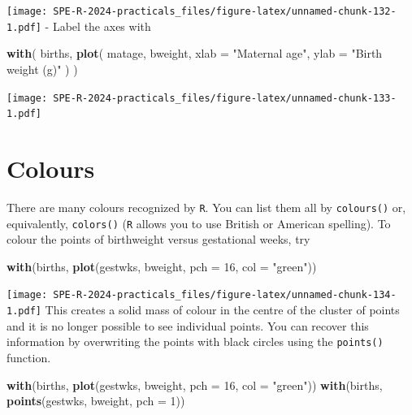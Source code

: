 \documentclass[
]{book}
\newenvironment{Shaded}{\begin{snugshade}}{\end{snugshade}}
\newcommand{\AttributeTok}[1]{\textcolor[rgb]{0.13,0.29,0.53}{#1}}
\newcommand{\DecValTok}[1]{\textcolor[rgb]{0.00,0.00,0.81}{#1}}
\newcommand{\FunctionTok}[1]{\textcolor[rgb]{0.13,0.29,0.53}{\textbf{#1}}}
\newcommand{\NormalTok}[1]{#1}
\newcommand{\StringTok}[1]{\textcolor[rgb]{0.31,0.60,0.02}{#1}}
\begin{document}
\texttt{[image: SPE-R-2024-practicals\_files/figure-latex/unnamed-chunk-132-1.pdf]}
- Label the axes with

\begin{Shaded}
\begin{Highlighting}[]
\FunctionTok{with}\NormalTok{(}
\NormalTok{  births, }
  \FunctionTok{plot}\NormalTok{(}
\NormalTok{    matage, }
\NormalTok{    bweight, }
    \AttributeTok{xlab =} \StringTok{"Maternal age"}\NormalTok{, }
    \AttributeTok{ylab =} \StringTok{"Birth weight (g)"}
\NormalTok{  )}
\NormalTok{)}
\end{Highlighting}
\end{Shaded}

\texttt{[image: SPE-R-2024-practicals\_files/figure-latex/unnamed-chunk-133-1.pdf]}

\section{Colours}\label{colours}

There are many colours recognized by \texttt{R}. You can list them all by
\texttt{colours()} or, equivalently, \texttt{colors()} (\texttt{R} allows you to
use British or American spelling). To colour the points of birthweight
versus gestational weeks, try

\begin{Shaded}
\begin{Highlighting}[]
\FunctionTok{with}\NormalTok{(births, }\FunctionTok{plot}\NormalTok{(gestwks, bweight, }\AttributeTok{pch =} \DecValTok{16}\NormalTok{, }\AttributeTok{col =} \StringTok{"green"}\NormalTok{))}
\end{Highlighting}
\end{Shaded}

\texttt{[image: SPE-R-2024-practicals\_files/figure-latex/unnamed-chunk-134-1.pdf]}
This creates a solid mass of colour in the centre of the cluster of
points and it is no longer possible to see individual points. You can
recover this information by overwriting the points with black circles
using the \texttt{points()} function.

\begin{Shaded}
\begin{Highlighting}[]
\FunctionTok{with}\NormalTok{(births, }\FunctionTok{plot}\NormalTok{(gestwks, bweight, }\AttributeTok{pch =} \DecValTok{16}\NormalTok{, }\AttributeTok{col =} \StringTok{"green"}\NormalTok{))}
\FunctionTok{with}\NormalTok{(births, }\FunctionTok{points}\NormalTok{(gestwks, bweight, }\AttributeTok{pch =} \DecValTok{1}\NormalTok{))}
\end{Highlighting}
\end{Shaded}
\end{document}
